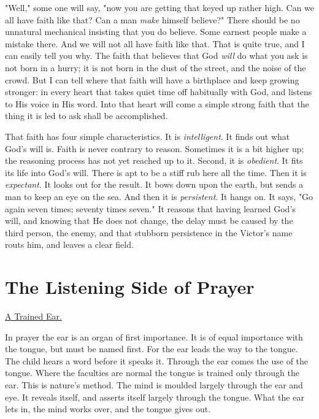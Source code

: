 "Well," some one will say, "now you are getting that keyed up rather high.
Can we all have faith like that? Can a man \textit{make} himself believe?" There
should be no unnatural mechanical insisting that you do believe. Some
earnest people make a mistake there. And we will not all have faith like
that. That is quite true, and I can easily tell you why. The faith that
believes that God \textit{will} do what you ask is not born in a hurry; it is not
born in the dust of the street, and the noise of the crowd. But I can tell
where that faith will have a birthplace and keep growing stronger: in
every heart that takes quiet time off habitually with God, and listens to
His voice in His word. Into that heart will come a simple strong faith
that the thing it is led to ask shall be accomplished.

That faith has four simple characteristics. It is \textit{intelligent}. It finds
out what God's will is. Faith is never contrary to reason. Sometimes it is
a bit higher up; the reasoning process has not yet reached up to it.
Second, it is \textit{obedient}. It fits its life into God's will. There is apt
to be a stiff rub here all the time. Then it is \textit{expectant}. It looks out
for the result. It bows down upon the earth, but sends a man to keep an
eye on the sea. And then it is \textit{persistent}. It hangs on. It says, "Go
again seven times; seventy times seven." It reasons that having learned
God's will, and knowing that He does not change, the delay must be caused
by the third person, the enemy, and that stubborn persistence in the
Victor's name routs him, and leaves a clear field.




\chapter{The Listening Side of Prayer}



\underline{A Trained Ear.}


In prayer the ear is an organ of first importance. It is of equal
importance with the tongue, but must be named first. For the ear leads the
way to the tongue. The child hears a word before it speaks it. Through the
ear comes the use of the tongue. Where the faculties are normal the tongue
is trained only through the ear. This is nature's method. The mind is
moulded largely through the ear and eye. It reveals itself, and asserts
itself largely through the tongue. What the ear lets in, the mind works
over, and the tongue gives out.

